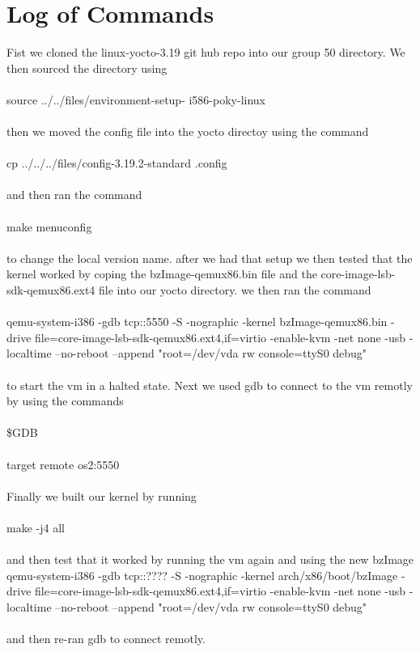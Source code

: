 \documentclass[letterpaper,10pt,titlepage]{article}
\begin{document}
\section{Log of Commands}
Fist we cloned the linux-yocto-3.19 git hub repo into our group 50 directory. 
We then sourced the directory using\\\\source ../../files/environment-setup-
i586-poky-linux\\\\then we moved the config file into the yocto directoy 
using the command\\\\cp ../../../files/config-3.19.2-standard .config\\\\ and 
then ran the command\\\\make menuconfig\\\\ to change the local version name.
after we had that setup we then tested that the kernel worked by coping the
bzImage-qemux86.bin file and the core-image-lsb-sdk-qemux86.ext4 file into
our yocto directory. we then ran the command\\\\qemu-system-i386 -gdb tcp::5550
-S -nographic -kernel bzImage-qemux86.bin -drive 
file=core-image-lsb-sdk-qemux86.ext4,if=virtio -enable-kvm -net none -usb 
-localtime --no-reboot --append "root=/dev/vda rw console=ttyS0 debug"\\\\ to 
start the vm in a halted state. Next we used gdb to connect to the vm remotly 
by using the commands\\\\\$GDB\\\\target remote os2:5550\\\\Finally we built our 
kernel by running\\\\make -j4 all\\\\
and then test that it worked by running the vm again and using the new bzImage 
qemu-system-i386 -gdb tcp::???? -S -nographic -kernel  arch/x86/boot/bzImage 
-drive file=core-image-lsb-sdk-qemux86.ext4,if=virtio -enable-kvm -net none 
-usb -localtime --no-reboot --append "root=/dev/vda rw console=ttyS0 debug"\\\\
and then re-ran gdb to connect remotly.
\end{document}
